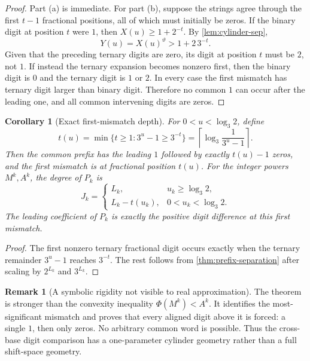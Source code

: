 \documentclass[11pt]{article}
\newtheorem{corollary}[theorem]{Corollary}
\theoremstyle{definition}
\newtheorem{remark}[theorem]{Remark}
\begin{document}
\begin{proof}
Part (a) is immediate.  For part (b), suppose the strings agree through the
first \(t-1\) fractional positions, all of which must initially be zeros.
If the binary digit at position \(t\) were \(1\), then
\(X(u)\ge1+2^{-t}\).  By \cref{lem:cylinder-sep},
\[
 Y(u)=X(u)^\vartheta>1+2\,3^{-t}.
\]
Given that the preceding ternary digits are zero, its digit at position
\(t\) must be \(2\), not \(1\).  If instead the ternary expansion becomes
nonzero first, then the binary digit is \(0\) and the ternary digit is
\(1\) or \(2\).  In every case the first mismatch has ternary digit larger
than binary digit.  Therefore no common \(1\) can occur after the leading
one, and all common intervening digits are zeros.
\end{proof}

\begin{corollary}[Exact first-mismatch depth]\label{cor:first-mismatch-depth}
For \(0<u<\log_3 2\), define
\begin{equation}\label{eq:t-of-u}
 t(u)=\min\{t\ge1:3^u-1\ge3^{-t}\}
     =\left\lceil\log_3\frac1{3^u-1}\right\rceil.
\end{equation}
Then the common prefix has the leading \(1\) followed by exactly
\(t(u)-1\) zeros, and the first mismatch is at fractional position \(t(u)\).
For the integer powers \(M^k,A^k\), the degree of \(P_k\) is
\begin{equation}\label{eq:Jk-formula}
 J_k=
 \begin{cases}
 L_k,&u_k\ge\log_3 2,\\
 L_k-t(u_k),&0<u_k<\log_3 2.
 \end{cases}
\end{equation}
The leading coefficient of \(P_k\) is exactly the positive digit difference
at this first mismatch.
\end{corollary}

\begin{proof}
The first nonzero ternary fractional digit occurs exactly when the ternary
remainder \(3^u-1\) reaches \(3^{-t}\).  The rest follows from
\cref{thm:prefix-separation} after scaling by \(2^{L_k}\) and \(3^{L_k}\).
\end{proof}

\begin{remark}[A symbolic rigidity not visible to real approximation]
The theorem is stronger than the convexity inequality
\(\Phi(M^k)<A^k\).  It identifies the most-significant mismatch and proves
that every aligned digit above it is forced: a single \(1\), then only
zeros.  No arbitrary common word is possible.  Thus the cross-base digit
comparison has a one-parameter cylinder geometry rather than a full
shift-space geometry.
\end{remark}
\end{document}
